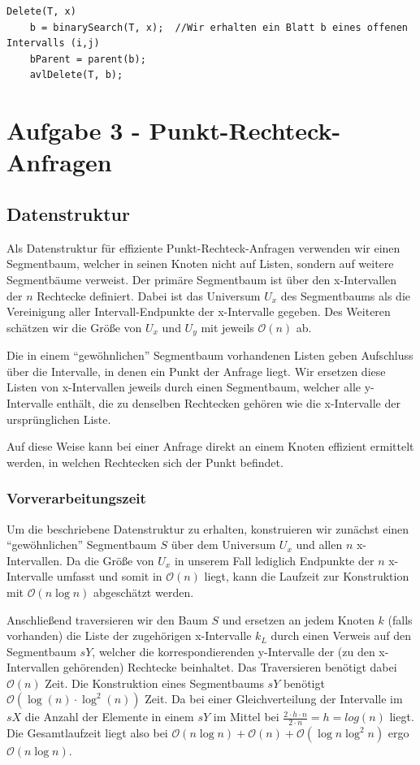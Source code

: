 \documentclass[a4paper]{article}
\begin{document}
\begin{lstlisting}
Delete(T, x)
	b = binarySearch(T, x);  //Wir erhalten ein Blatt b eines offenen Intervalls (i,j)
	bParent = parent(b);
	avlDelete(T, b);
\end{lstlisting}




\section*{Aufgabe 3 - Punkt-Rechteck-Anfragen}

\subsection*{Datenstruktur}
Als Datenstruktur für effiziente Punkt-Rechteck-Anfragen verwenden wir einen Segmentbaum, 
welcher in seinen Knoten nicht auf Listen, sondern auf weitere Segmentbäume verweist.
Der primäre Segmentbaum ist über den x-Intervallen der $n$ Rechtecke definiert. 
Dabei ist das Universum $U_x$ des Segmentbaums als die Vereinigung aller Intervall-Endpunkte
der x-Intervalle gegeben. Des Weiteren schätzen wir die Größe von $U_x$ und $U_y$ mit jeweils $\mathcal{O}(n)$ ab.

Die in einem "`gewöhnlichen"' Segmentbaum vorhandenen Listen geben Aufschluss über die 
Intervalle, in denen ein Punkt der Anfrage liegt. Wir ersetzen diese Listen von 
x-Intervallen jeweils durch einen Segmentbaum, welcher alle y-Intervalle enthält, 
die zu denselben Rechtecken gehören wie die x-Intervalle der ursprünglichen Liste.

Auf diese Weise kann bei einer Anfrage direkt an einem Knoten effizient ermittelt werden, 
in welchen Rechtecken sich der Punkt befindet. 


\subsubsection*{Vorverarbeitungszeit}
Um die beschriebene Datenstruktur zu erhalten, konstruieren wir zunächst einen
"`gewöhnlichen"' Segmentbaum $S$ über dem Universum $U_x$ und allen 
$n$ x-Intervallen. Da die Größe von $U_x$ in unserem Fall 
lediglich Endpunkte der $n$ x-Intervalle umfasst und somit in $\mathcal{O}(n)$ liegt, 
kann die Laufzeit zur Konstruktion mit $\mathcal{O}(n \log n)$ abgeschätzt werden.

Anschließend traversieren wir den Baum $S$ und ersetzen an jedem Knoten $k$ (falls vorhanden)
die Liste der zugehörigen x-Intervalle $k_L$ durch einen Verweis auf 
den Segmentbaum $sY$, welcher die korrespondierenden y-Intervalle der (zu den x-Intervallen 
gehörenden) Rechtecke beinhaltet. Das Traversieren benötigt dabei $\mathcal{O}(n)$ Zeit.
Die Konstruktion eines Segmentbaums $sY$ benötigt $\mathcal{O}(\log(n) \cdot \log^2(n))$ Zeit. Da bei einer Gleichverteilung der Intervalle im $sX$ die Anzahl der Elemente in einem $sY$ im Mittel bei $\frac{2 \cdot h  \cdot n}{2 \cdot n} = h = log(n)$ liegt.
Die Gesamtlaufzeit liegt also bei $\mathcal{O}(n \log n) + \mathcal{O}(n) + \mathcal{O}(\log n \log^2 n)$ ergo $\mathcal{O}(n \log n)$. 
\end{document}
